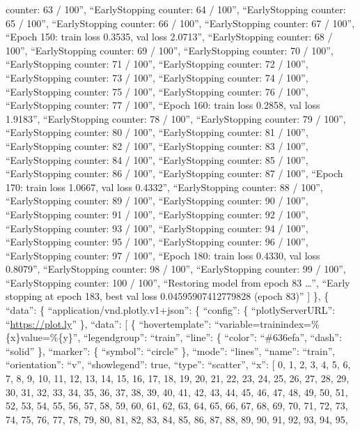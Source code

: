 \documentclass[
]{article}
\begin{document}
counter: 63 / 100\n'', ``EarlyStopping counter: 64 / 100\n'',
``EarlyStopping counter: 65 / 100\n'', ``EarlyStopping counter: 66 /
100\n'', ``EarlyStopping counter: 67 / 100\n'', ``Epoch 150: train loss
0.3535, val loss 2.0713\n'', ``EarlyStopping counter: 68 / 100\n'',
``EarlyStopping counter: 69 / 100\n'', ``EarlyStopping counter: 70 /
100\n'', ``EarlyStopping counter: 71 / 100\n'', ``EarlyStopping counter:
72 / 100\n'', ``EarlyStopping counter: 73 / 100\n'', ``EarlyStopping
counter: 74 / 100\n'', ``EarlyStopping counter: 75 / 100\n'',
``EarlyStopping counter: 76 / 100\n'', ``EarlyStopping counter: 77 /
100\n'', ``Epoch 160: train loss 0.2858, val loss 1.9183\n'',
``EarlyStopping counter: 78 / 100\n'', ``EarlyStopping counter: 79 /
100\n'', ``EarlyStopping counter: 80 / 100\n'', ``EarlyStopping counter:
81 / 100\n'', ``EarlyStopping counter: 82 / 100\n'', ``EarlyStopping
counter: 83 / 100\n'', ``EarlyStopping counter: 84 / 100\n'',
``EarlyStopping counter: 85 / 100\n'', ``EarlyStopping counter: 86 /
100\n'', ``EarlyStopping counter: 87 / 100\n'', ``Epoch 170: train loss
1.0667, val loss 0.4332\n'', ``EarlyStopping counter: 88 / 100\n'',
``EarlyStopping counter: 89 / 100\n'', ``EarlyStopping counter: 90 /
100\n'', ``EarlyStopping counter: 91 / 100\n'', ``EarlyStopping counter:
92 / 100\n'', ``EarlyStopping counter: 93 / 100\n'', ``EarlyStopping
counter: 94 / 100\n'', ``EarlyStopping counter: 95 / 100\n'',
``EarlyStopping counter: 96 / 100\n'', ``EarlyStopping counter: 97 /
100\n'', ``Epoch 180: train loss 0.4330, val loss 0.8079\n'',
``EarlyStopping counter: 98 / 100\n'', ``EarlyStopping counter: 99 /
100\n'', ``EarlyStopping counter: 100 / 100\n'', ``Restoring model from
epoch 83 \ldots{}\n'', ``Early stopping at epoch 183, best val loss
0.04595907412779828 (epoch 83)\n'' {]} \}, \{ ``data'': \{
``application/vnd.plotly.v1+json'': \{ ``config'': \{
``plotlyServerURL'': ``\url{https://plot.ly}'' \}, ``data'': {[} \{
``hovertemplate'': ``variable=trainindex=\%\{x\}value=\%\{y\}'',
``legendgroup'': ``train'', ``line'': \{ ``color'': ``\#636efa'',
``dash'': ``solid'' \}, ``marker'': \{ ``symbol'': ``circle'' \},
``mode'': ``lines'', ``name'': ``train'', ``orientation'': ``v'',
``showlegend'': true, ``type'': ``scatter'', ``x'': {[} 0, 1, 2, 3, 4,
5, 6, 7, 8, 9, 10, 11, 12, 13, 14, 15, 16, 17, 18, 19, 20, 21, 22, 23,
24, 25, 26, 27, 28, 29, 30, 31, 32, 33, 34, 35, 36, 37, 38, 39, 40, 41,
42, 43, 44, 45, 46, 47, 48, 49, 50, 51, 52, 53, 54, 55, 56, 57, 58, 59,
60, 61, 62, 63, 64, 65, 66, 67, 68, 69, 70, 71, 72, 73, 74, 75, 76, 77,
78, 79, 80, 81, 82, 83, 84, 85, 86, 87, 88, 89, 90, 91, 92, 93, 94, 95,
\end{document}
